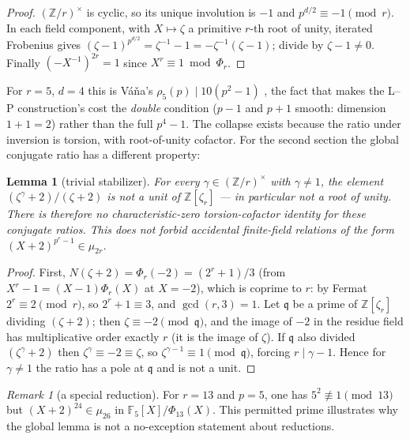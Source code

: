 \documentclass[11pt]{article}
\newtheorem{lemma}[theorem]{Lemma}
\theoremstyle{remark}
\newtheorem{remark}[theorem]{Remark}
\newcommand{\Z}{\mathbb{Z}}
\newcommand{\F}{\mathbb{F}}
\begin{document}
\begin{proof}
$(\Z/r)^\times$ is cyclic, so its unique involution is $-1$ and
$p^{d/2} \equiv -1 \pmod r$. In each field component, with $X \mapsto
\zeta$ a primitive $r$-th root of unity, iterated Frobenius gives
$(\zeta - 1)^{p^{d/2}} = \zeta^{-1} - 1 = -\zeta^{-1}(\zeta - 1)$;
divide by $\zeta - 1 \ne 0$. Finally $(-X^{-1})^{2r} = 1$ since
$X^r \equiv 1 \bmod \Phi_r$.
\end{proof}

For $r = 5$, $d = 4$ this is V\'a\v{n}a's $\rho_5(p) \mid 10(p^2 - 1)$
\cite{Vana09}, the fact that makes the L--P construction's cost the
\emph{double} condition ($p - 1$ and $p + 1$ smooth: dimension
$1 + 1 = 2$) rather than the full $p^4 - 1$. The collapse exists because
the ratio under inversion is torsion,
with root-of-unity cofactor. For the second section the global conjugate
ratio has a different property:

\begin{lemma}[trivial stabilizer]\label{lem:nonunit}
For every $\gamma \in (\Z/r)^\times$ with $\gamma \ne 1$, the element
$(\zeta^\gamma + 2)/(\zeta + 2)$ is not a unit of $\Z[\zeta_r]$ --- in
particular not a root of unity. There is therefore no characteristic-zero
torsion-cofactor identity for these conjugate ratios. This does not forbid
accidental finite-field relations of the form
$(X+2)^{p^e-1}\in\mu_{2r}$.
\end{lemma}

\begin{proof}
First, $N(\zeta + 2) = \Phi_r(-2) = (2^r + 1)/3$ (from $X^r - 1 =
(X - 1)\Phi_r(X)$ at $X = -2$), which is coprime to $r$: by Fermat
$2^r \equiv 2 \pmod r$, so $2^r + 1 \equiv 3$, and $\gcd(r, 3) = 1$.
Let $\mathfrak q$ be a prime of $\Z[\zeta_r]$ dividing $(\zeta + 2)$;
then $\zeta \equiv -2 \pmod{\mathfrak q}$, and the image of $-2$ in the
residue field has multiplicative order exactly $r$ (it is the image of
$\zeta$). If $\mathfrak q$ also divided $(\zeta^\gamma + 2)$ then
$\zeta^\gamma \equiv -2 \equiv \zeta$, so $\zeta^{\gamma - 1} \equiv 1
\pmod{\mathfrak q}$, forcing $r \mid \gamma - 1$. Hence for
$\gamma \ne 1$ the ratio has a pole at $\mathfrak q$ and is not a unit.
\end{proof}

\begin{remark}[a special reduction]
For $r=13$ and $p=5$, one has $5^2\not\equiv1\pmod{13}$ but
$(X+2)^{24}\in\mu_{26}$ in $\F_5[X]/\Phi_{13}(X)$.
This permitted prime illustrates why the global lemma is not a
no-exception statement about reductions.
\end{remark}
\end{document}

